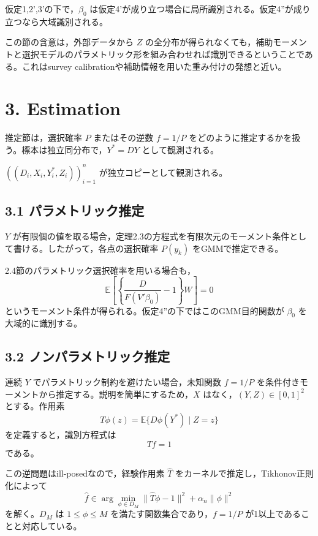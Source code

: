 \documentclass[10pt,a4paper]{article}
\newcommand{\E}{\mathbb{E}}
\begin{document}
\begin{description}[leftmargin=3.2em]
\item[定理2.7] 仮定1,2',3'の下で，$\beta_0$ は仮定4'が成り立つ場合に局所識別される。仮定4''が成り立つなら大域識別される。
\end{description}

この節の含意は，外部データから $Z$ の全分布が得られなくても，補助モーメントと選択モデルのパラメトリック形を組み合わせれば識別できるということである。これはsurvey calibrationや補助情報を用いた重み付けの発想と近い。

\section{3. Estimation}

推定節は，選択確率 $P$ またはその逆数 $f=1/P$ をどのように推定するかを扱う。標本は独立同分布で，$Y^*=DY$ として観測される。

\begin{description}[leftmargin=3.2em]
\item[仮定7] $((D_i,X_i,Y_i^*,Z_i))_{i=1}^n$ が独立コピーとして観測される。
\end{description}

\subsection{3.1 パラメトリック推定}

$Y$ が有限個の値を取る場合，定理2.3の方程式を有限次元のモーメント条件として書ける。したがって，各点の選択確率 $P(y_k)$ をGMMで推定できる。

2.4節のパラメトリック選択確率を用いる場合も，
\[
\E\left[\left\{\frac{D}{F(V'\beta_0)}-1\right\}W\right]=0
\]
というモーメント条件が得られる。仮定4''の下ではこのGMM目的関数が $\beta_0$ を大域的に識別する。

\subsection{3.2 ノンパラメトリック推定}

連続 $Y$ でパラメトリック制約を避けたい場合，未知関数 $f=1/P$ を条件付きモーメントから推定する。説明を簡単にするため，$X$ はなく，$(Y,Z)\in[0,1]^2$ とする。作用素
\[
T\phi(z)=\E\{D\phi(Y^*)\mid Z=z\}
\]
を定義すると，識別方程式は
\[
Tf=1
\]
である。

この逆問題はill-posedなので，経験作用素 $\widehat T$ をカーネルで推定し，Tikhonov正則化によって
\[
\widehat f\in\arg\min_{\phi\in D_M}\|\widehat T\phi-1\|^2+\alpha_n\|\phi\|^2
\]
を解く。$D_M$ は $1\leq \phi\leq M$ を満たす関数集合であり，$f=1/P$ が1以上であることと対応している。
\end{document}
